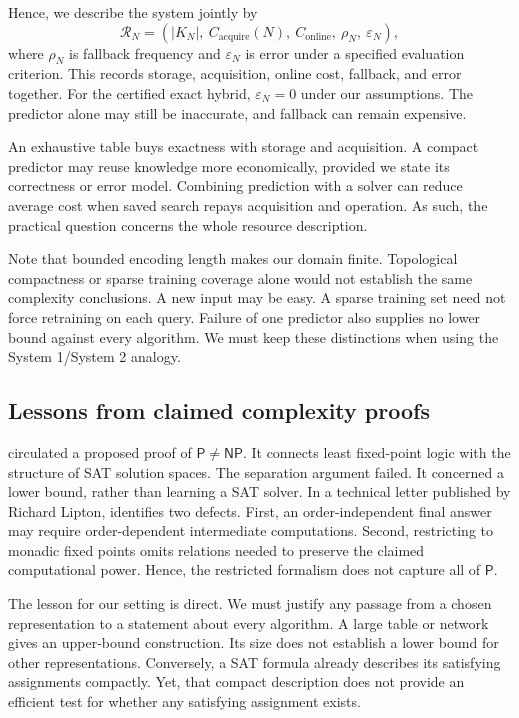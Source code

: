 \documentclass[11pt,a4paper]{article}
\numberwithin{equation}{section}
\newcommand{\Pclass}{\mathsf{P}}
\newcommand{\NPclass}{\mathsf{NP}}
\theoremstyle{plain}
\theoremstyle{definition}
\theoremstyle{remark}
\begin{document}
Hence, we describe the system jointly by
\begin{equation}
\mathcal R_N=
\left(
|K_N|,\ C_{\mathrm{acquire}}(N),\ C_{\mathrm{online}},\
\rho_N,\ \varepsilon_N
\right),
\end{equation}
where $\rho_N$ is fallback frequency and $\varepsilon_N$ is error under a specified evaluation criterion. This records storage, acquisition, online cost, fallback, and error together. For the certified exact hybrid, $\varepsilon_N=0$ under our assumptions. The predictor alone may still be inaccurate, and fallback can remain expensive.

An exhaustive table buys exactness with storage and acquisition. A compact predictor may reuse knowledge more economically, provided we state its correctness or error model. Combining prediction with a solver can reduce average cost when saved search repays acquisition and operation. As such, the practical question concerns the whole resource description.

Note that bounded encoding length makes our domain finite. Topological compactness or sparse training coverage alone would not establish the same complexity conclusions. A new input may be easy. A sparse training set need not force retraining on each query. Failure of one predictor also supplies no lower bound against every algorithm. We must keep these distinctions when using the System 1/System 2 analogy.

\subsection{Lessons from claimed complexity proofs}

\citet{deolalikar2010claim} circulated a proposed proof of $\Pclass\neq\NPclass$. It connects least fixed-point logic with the structure of SAT solution spaces. The separation argument failed. It concerned a lower bound, rather than learning a SAT solver. In a technical letter published by Richard Lipton, \citet{immerman2010objections} identifies two defects. First, an order-independent final answer may require order-dependent intermediate computations. Second, restricting to monadic fixed points omits relations needed to preserve the claimed computational power. Hence, the restricted formalism does not capture all of $\Pclass$.

The lesson for our setting is direct. We must justify any passage from a chosen representation to a statement about every algorithm. A large table or network gives an upper-bound construction. Its size does not establish a lower bound for other representations. Conversely, a SAT formula already describes its satisfying assignments compactly. Yet, that compact description does not provide an efficient test for whether any satisfying assignment exists.
\end{document}
